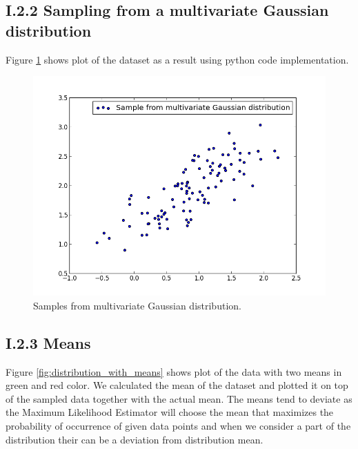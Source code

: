 \documentclass[12pt]{article}
\begin{document}
\subsection*{I.2.2 Sampling from a multivariate Gaussian distribution}
  
 Figure \ref{fig:multivariate_gaussian_distribution} shows plot of the dataset as a result using python code implementation.
 
  \begin{figure}[H]
    \centering
        \includegraphics[width=1.0\textwidth]{figures/figure_I_2_2}
    \caption{Samples from multivariate Gaussian distribution.}
    \label{fig:multivariate_gaussian_distribution}
  \end{figure}
  
\subsection*{I.2.3 Means}
  
  Figure \ref{fig:distribution_with_means} shows plot of the data with two means in green and red color. We calculated the mean of the dataset and plotted it on top of the sampled data together with the actual mean. The means tend to deviate as the Maximum Likelihood Estimator will choose the mean that maximizes the probability of occurrence of given data points and when we consider a part of the distribution their can be a deviation from distribution mean.  
\end{document}
